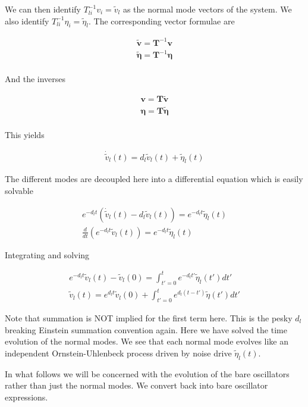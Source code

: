 \documentclass[12pt]{article}
\newcommand{\bv}[1]{\boldsymbol{#1}}
\begin{document}
We can then identify $T^{-1}_{li}v_i = \tilde{v}_l$ as the normal mode vectors of the system. We also identify $T^{-1}_{li}\eta_{i} = \tilde{\eta}_l$. The corresponding vector formulae are

\begin{align}
\tilde{\bv{v}} = \bv{T}^{-1}\bv{v}\\
\tilde{\bv{\eta}} = \bv{T}^{-1}\bv{\eta}\\
\end{align}

And the inverses

\begin{align}
\bv{v} = \bv{T}\tilde{\bv{v}}\\
\bv{\eta} = \bv{T}\tilde{\bv{\eta}}\\
\end{align}

This yields

\begin{align}
\dot{\tilde{v}}_l(t) = d_l \tilde{v}_l(t) + \tilde{\eta}_l(t)
\end{align}

The different modes are decoupled here into a differential equation which is easily solvable

\begin{align}
e^{-d_l t}\left(\dot{\tilde{v}}_l(t) - d_l \tilde{v}_l(t)\right) = e^{-d_lt}\tilde{\eta}_l(t)\\
\frac{d}{dt}\left(e^{-d_l t} \tilde{v}_l(t)\right) = e^{-d_l t}\tilde{\eta}_l(t)
\end{align}

Integrating and solving

\begin{align}
e^{-d_l t} \tilde{v}_l(t) - \tilde{v}_l(0) = \int_{t'=0}^{t}e^{-d_l t'}\tilde{\eta}_l(t')dt'\\
\tilde{v}_l(t) = e^{d_l t}\tilde{v}_l(0) + \int_{t'=0}^{t} e^{d_l (t-t')} \tilde{\eta}(t')dt'
\end{align}

Note that summation is NOT implied for the first term here. This is the pesky $d_l$ breaking Einstein summation convention again. Here we have solved the time evolution of the normal modes. We see that each normal mode evolves like an independent Ornstein-Uhlenbeck process driven by noise drive $\tilde{\eta}_l(t)$.

In what follows we will be concerned with the evolution of the bare oscillators rather than just the normal modes. We convert back into bare oscillator expressions.
\end{document}
